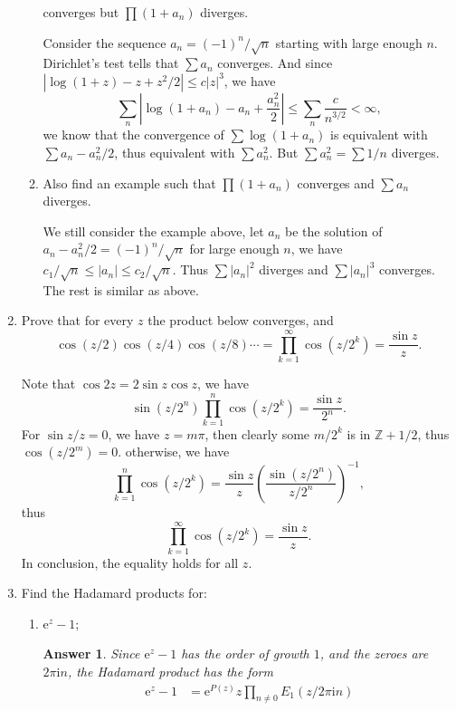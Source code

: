 \documentclass[11pt]{report}
\theoremstyle{mythm}
\let\oldendproof\endproof
\renewenvironment{proof}[1][\proofname]{%
  \oldproof[\normalfont \bfseries #1]%
}{\oldendproof}
\renewcommand*{\proofname}{Proof}
\theoremstyle{myans}
\newtheorem*{answer}{Answer}
\newcommand{\mi}{\mathrm{i}}
\newcommand{\me}{\mathrm{e}}
\begin{document}
\begin{enumerate}
\begin{enumerate}
    converges but $\prod (1+a_n)$ diverges.
    \begin{proof}
      Consider the sequence $a_n = (-1)^n / \sqrt{n}$ starting with large enough $n$.
      Dirichlet's test tells that $\sum a_n$ converges. And since $\left|\log (1+z) - z + z^2/2\right| \leq c|z|^3$,
      we have
      \[ \sum_n \left| \log(1+a_n) - a_n + \frac{a_n^2}{2} \right|
      \leq \sum_n \frac{c}{n^{3/2}} < \infty, \]
      we know that the convergence of $\sum \log (1+a_n)$ is equivalent with $\sum a_n - a_n^2/2$,
      thus equivalent with $\sum a_n^2$. But $\sum a_n^2 = \sum 1/n$ diverges.
    \end{proof}
    \item Also find an example such that $\prod (1 + a_n)$ converges and $\sum a_n$ diverges.
    \begin{proof}
      We still consider the example above, let $a_n$ be the solution
      of $a_n - a_n^2/2 = (-1)^n/\sqrt n$ for large enough $n$, we have $c_1/\sqrt{n} \leq |a_n|\leq c_2/\sqrt{n}$.
      Thus $\sum |a_n|^2$ diverges and $\sum |a_n|^3$ converges. The rest is similar as above.
    \end{proof}
  \end{enumerate}
  \item Prove that for every $z$ the product below converges, and
  \[ \cos(z/2) \cos(z/4) \cos(z/8)\cdots = \prod_{k=1}^\infty \cos(z/2^k) = \frac{\sin z}{z}. \]
  \begin{proof}
    Note that $\cos 2z = 2\sin z \cos z$, we have
    \[ \sin (z/2^n)\prod_{k=1}^{n} \cos(z/2^k) = \frac{\sin z}{2^n}. \]
    For $\sin z / z = 0$, we have $z = m \pi$, then clearly some $m/2^k$ is in $\mathbb Z+1/2$, thus $\cos (z/2^m) = 0$.
    otherwise, we have
    \[ \prod_{k=1}^n \cos(z/2^k) = \frac{\sin z}{z} \left(\frac{\sin(z/2^n)}{z/2^n}\right)^{-1}, \]
    thus
    \[ \prod_{k=1}^\infty \cos(z/2^k) = \frac{\sin z}{z}. \]
    In conclusion, the equality holds for all $z$.
  \end{proof}
  \setcounter{enumi}{9}
  \item Find the Hadamard products for:
  \begin{enumerate}
    \item $\me^z-1$;
    \begin{answer}
      Since $\me^{z}-1$ has the order of growth $1$, and the zeroes are $2\pi \mi n$,
      the Hadamard product has the form
      \begin{align*}
        \me^z - 1 &= \me^{P(z)} z \prod_{n\neq 0} E_1(z/2\pi \mi n)\\

\end{align*}
\end{answer}
\end{enumerate}
\end{enumerate}
\end{document}

